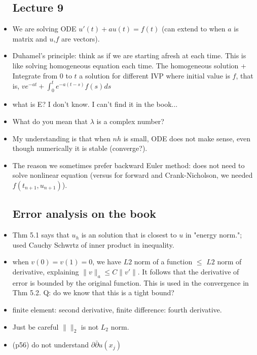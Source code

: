 \documentclass{article}
\theoremstyle{remark}
\begin{document}
\begin{itemize}
\subsection*{Lecture 9}
\item We are solving ODE $u'(t)+au(t)=f(t)$ (can extend to when $a$ is matrix and $u$,$f$ are vectors).
\item Duhamel's principle: think as if we are starting afresh at each time. This is like solving homogeneous equation each time. The homogeneous solution + Integrate from $0$ to $t$ a solution for different IVP where initial value is $f$, that is, $ve^{-at}+\int^t_0e^{-a(t-s)}f(s)ds$
    \item what is E? I don't know. I can't find it in the book...
    \item What do you mean that $\lambda$ is a complex number?
    \item My understanding is that when $nh$ is small, ODE does not make sense, even though numerically it is stable (converge?).
    \item The reason we sometimes prefer backward Euler method: does not need to solve nonlinear equation (versus for forward and Crank-Nicholson, we needed $f (t_{n+1},u_{n+1})$).
    \subsection*{Error analysis on the book}
    \item Thm 5.1 says that $u_h$ is an solution that is closest to $u$ in "energy norm."; used Cauchy Schwrtz of inner product in inequality.
    \item when $v(0)=v(1)=0$, we have $L2$ norm of a function $\leq$ $L2$ norm of derivative, explaining $\lVert v\rVert_a\leq C\lVert v'\rVert$. It follows that the derivative of error is bounded by the original function. This is used in the convergence in Thm 5.2.
    Q: do we know that this is a tight bound?
    \item finite element: second derivative, finite difference: fourth derivative.
    \item Just be careful $\lVert \rVert_2$ is not $L_2$ norm.
    \item (p56) do not understand $\partial\bar\partial u(x_j)$


\end{itemize}
\end{document}
